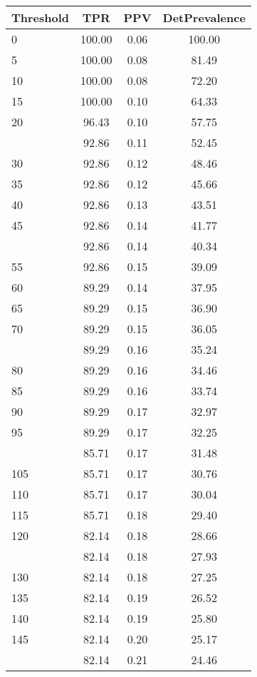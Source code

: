 \begin{table}[ht]
\centering
\begin{tabular}{lccc}
  \toprule
Threshold & TPR & PPV & DetPrevalence \\ 
  \midrule
0 & 100.00 & 0.06 & 100.00 \\ 
  5 & 100.00 & 0.08 & 81.49 \\ 
  10 & 100.00 & 0.08 & 72.20 \\ 
  15 & 100.00 & 0.10 & 64.33 \\ 
  20 & 96.43 & 0.10 & 57.75 \\ 
   \addlinespace
25 & 92.86 & 0.11 & 52.45 \\ 
  30 & 92.86 & 0.12 & 48.46 \\ 
  35 & 92.86 & 0.12 & 45.66 \\ 
  40 & 92.86 & 0.13 & 43.51 \\ 
  45 & 92.86 & 0.14 & 41.77 \\ 
   \addlinespace
50 & 92.86 & 0.14 & 40.34 \\ 
  55 & 92.86 & 0.15 & 39.09 \\ 
  60 & 89.29 & 0.14 & 37.95 \\ 
  65 & 89.29 & 0.15 & 36.90 \\ 
  70 & 89.29 & 0.15 & 36.05 \\ 
   \addlinespace
75 & 89.29 & 0.16 & 35.24 \\ 
  80 & 89.29 & 0.16 & 34.46 \\ 
  85 & 89.29 & 0.16 & 33.74 \\ 
  90 & 89.29 & 0.17 & 32.97 \\ 
  95 & 89.29 & 0.17 & 32.25 \\ 
   \addlinespace
100 & 85.71 & 0.17 & 31.48 \\ 
  105 & 85.71 & 0.17 & 30.76 \\ 
  110 & 85.71 & 0.17 & 30.04 \\ 
  115 & 85.71 & 0.18 & 29.40 \\ 
  120 & 82.14 & 0.18 & 28.66 \\ 
   \addlinespace
125 & 82.14 & 0.18 & 27.93 \\ 
  130 & 82.14 & 0.18 & 27.25 \\ 
  135 & 82.14 & 0.19 & 26.52 \\ 
  140 & 82.14 & 0.19 & 25.80 \\ 
  145 & 82.14 & 0.20 & 25.17 \\ 
   \addlinespace
150 & 82.14 & 0.21 & 24.46 \\ 

\end{tabular}
\end{table}
